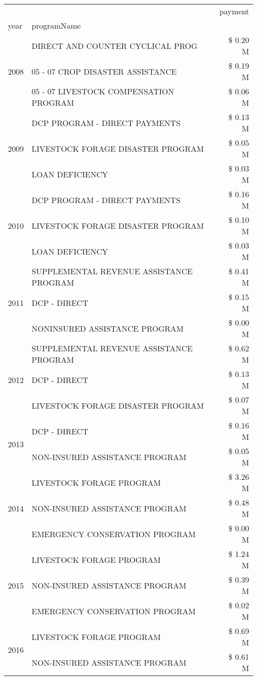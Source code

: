 \begin{tabular}{llr}
\toprule
 &  & payment \\
year & programName &  \\
\midrule
\multirow[t]{3}{*}{2008} & DIRECT AND COUNTER CYCLICAL PROG & \$ 0.20 M \\
 & 05 - 07 CROP DISASTER ASSISTANCE & \$ 0.19 M \\
 & 05 - 07 LIVESTOCK COMPENSATION PROGRAM & \$ 0.06 M \\
\cline{1-3}
\multirow[t]{3}{*}{2009} & DCP PROGRAM - DIRECT PAYMENTS & \$ 0.13 M \\
 & LIVESTOCK FORAGE DISASTER  PROGRAM & \$ 0.05 M \\
 & LOAN DEFICIENCY & \$ 0.03 M \\
\cline{1-3}
\multirow[t]{3}{*}{2010} & DCP PROGRAM - DIRECT PAYMENTS & \$ 0.16 M \\
 & LIVESTOCK FORAGE DISASTER  PROGRAM & \$ 0.10 M \\
 & LOAN DEFICIENCY & \$ 0.03 M \\
\cline{1-3}
\multirow[t]{3}{*}{2011} & SUPPLEMENTAL REVENUE ASSISTANCE PROGRAM & \$ 0.41 M \\
 & DCP - DIRECT & \$ 0.15 M \\
 & NONINSURED ASSISTANCE PROGRAM & \$ 0.00 M \\
\cline{1-3}
\multirow[t]{3}{*}{2012} & SUPPLEMENTAL REVENUE ASSISTANCE PROGRAM & \$ 0.62 M \\
 & DCP - DIRECT & \$ 0.13 M \\
 & LIVESTOCK FORAGE DISASTER PROGRAM & \$ 0.07 M \\
\cline{1-3}
\multirow[t]{2}{*}{2013} & DCP - DIRECT & \$ 0.16 M \\
 & NON-INSURED ASSISTANCE PROGRAM & \$ 0.05 M \\
\cline{1-3}
\multirow[t]{3}{*}{2014} & LIVESTOCK FORAGE PROGRAM & \$ 3.26 M \\
 & NON-INSURED ASSISTANCE PROGRAM & \$ 0.48 M \\
 & EMERGENCY CONSERVATION PROGRAM & \$ 0.00 M \\
\cline{1-3}
\multirow[t]{3}{*}{2015} & LIVESTOCK FORAGE PROGRAM & \$ 1.24 M \\
 & NON-INSURED ASSISTANCE PROGRAM & \$ 0.39 M \\
 & EMERGENCY CONSERVATION PROGRAM & \$ 0.02 M \\
\cline{1-3}
\multirow[t]{3}{*}{2016} & LIVESTOCK FORAGE PROGRAM & \$ 0.69 M \\
 & NON-INSURED ASSISTANCE PROGRAM & \$ 0.61 M \\

\end{tabular}

